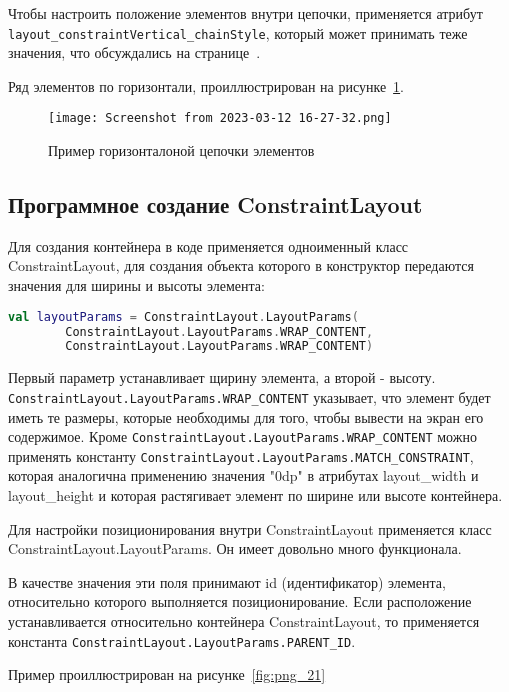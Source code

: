 Чтобы настроить положение элементов внутри цепочки, применяется
атрибут \texttt{layout\_constraintVertical\_chainStyle},
который может принимать теже значения, что обсуждались
на странице~\pageref{tag:chain:style}.

Ряд элементов по горизонтали, проиллюстрирован на
рисунке~\ref{fig:xml:chain:vertical}.

\begin{figure}[h!tp]
	\centering
	\texttt{[image: Screenshot from 2023-03-12 16-27-32.png]}
	\caption{Пример горизонталоной цепочки элементов}
	\label{fig:xml:chain:vertical}
\end{figure}

\subsection{Программное создание ConstraintLayout}
Для создания контейнера в коде применяется одноименный класс
ConstraintLayout, для создания объекта которого в конструктор передаются
значения для ширины и высоты элемента:
\begin{lstlisting}[language=Kotlin, caption=\leftline{Kotlin}, label=lst:gravity]
val layoutParams = ConstraintLayout.LayoutParams(
		ConstraintLayout.LayoutParams.WRAP_CONTENT,
		ConstraintLayout.LayoutParams.WRAP_CONTENT)
\end{lstlisting}

Первый параметр устанавливает щирину элемента, а второй - высоту.
\texttt{ConstraintLayout.LayoutParams.WRAP\_CONTENT} указывает, что элемент
будет иметь те размеры, которые необходимы для того, чтобы вывести на
экран его содержимое. Кроме
\texttt{ConstraintLayout.LayoutParams.WRAP\_CONTENT} можно применять
константу \texttt{ConstraintLayout.LayoutParams.MATCH\_CONSTRAINT}, которая
аналогична применению значения "0dp" в атрибутах layout\_width и
layout\_height и которая растягивает элемент по ширине или высоте
контейнера.\par
Для настройки позиционирования внутри ConstraintLayout применяется класс
ConstraintLayout.LayoutParams. Он имеет довольно много функционала.\par
В качестве значения эти поля принимают id (идентификатор) элемента,
относительно которого выполняется позиционирование. Если расположение
устанавливается относительно контейнера ConstraintLayout, то применяется
константа \texttt{ConstraintLayout.LayoutParams.PARENT\_ID}.

Пример проиллюстрирован на рисунке~\ref{fig:png_21}

